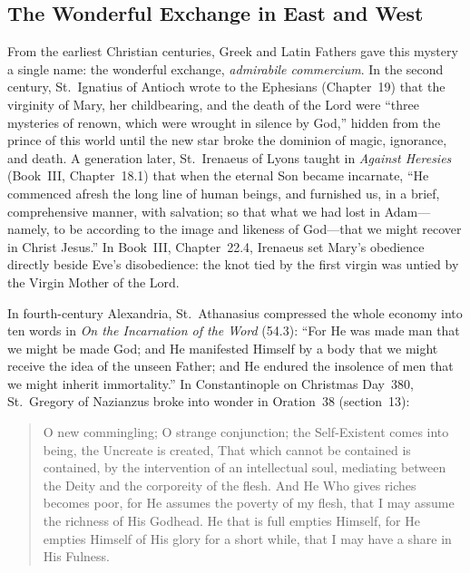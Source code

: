 \subsection{The Wonderful Exchange in East and West}

From the earliest Christian centuries, Greek and Latin Fathers gave this mystery
a single name: the wonderful exchange, \textit{admirabile commercium}. In the
second century, St.~Ignatius of Antioch wrote to the Ephesians (Chapter~19) that
the virginity of Mary, her childbearing, and the death of the Lord were ``three
mysteries of renown, which were wrought in silence by God,'' hidden from the
prince of this world until the new star broke the dominion of magic, ignorance,
and death. A generation later, St.~Irenaeus of Lyons taught in \textit{Against
Heresies} (Book~III, Chapter~18.1) that when the eternal Son became incarnate,
``He commenced afresh the long line of human beings, and furnished us, in a
brief, comprehensive manner, with salvation; so that what we had lost in
Adam---namely, to be according to the image and likeness of God---that we might
recover in Christ Jesus.'' In Book~III, Chapter~22.4, Irenaeus set Mary's
obedience directly beside Eve's disobedience: the knot tied by the first virgin
was untied by the Virgin Mother of the Lord.

In fourth-century Alexandria, St.~Athanasius compressed the whole economy into
ten words in \textit{On the Incarnation of the Word} (54.3): ``For He was made
man that we might be made God; and He manifested Himself by a body that we might
receive the idea of the unseen Father; and He endured the insolence of men that
we might inherit immortality.'' In Constantinople on Christmas Day~380,
St.~Gregory of Nazianzus broke into wonder in Oration~38 (section~13):

\begin{quote}
O new commingling; O strange conjunction; the Self-Existent comes into being,
the Uncreate is created, That which cannot be contained is contained, by the
intervention of an intellectual soul, mediating between the Deity and the
corporeity of the flesh. And He Who gives riches becomes poor, for He assumes
the poverty of my flesh, that I may assume the richness of His Godhead. He that
is full empties Himself, for He empties Himself of His glory for a short while,
that I may have a share in His Fulness.
\end{quote}

